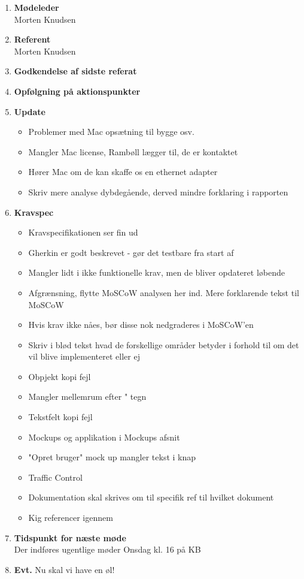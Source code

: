 	\begin{enumerate}
		\itemsep 0.3em 
		\item \textbf{Mødeleder}\\
			Morten Knudsen
		\item \textbf{Referent}\\
			Morten Knudsen
		\item \textbf{Godkendelse af sidste referat}
			
		\item\textbf{Opfølgning på aktionspunkter}

		\item \textbf{Update}
			\begin{itemize}[-]
			\item Problemer med Mac opsætning til bygge osv. \\
			\item Mangler Mac license, Rambøll lægger til, de er kontaktet \\
			\item Hører Mac om de kan skaffe os en ethernet adapter \\
			
			\item Skriv mere analyse dybdegående, derved mindre forklaring i rapporten
		\end{itemize}
	
		\item \textbf{Kravspec}
		\begin{itemize}[-]
			\item Kravspecifikationen ser fin ud
			\item Gherkin er godt beskrevet - gør det testbare fra start af
			\item Mangler lidt i ikke funktionelle krav, men de bliver opdateret løbende
			\item Afgrænsning, flytte MoSCoW analysen her ind. Mere forklarende tekst til MoSCoW
			\item Hvis krav ikke nåes, bør disse nok nedgraderes i MoSCoW'en
			\item Skriv i blød tekst hvad de forskellige områder betyder i forhold til om det vil blive implementeret eller ej
			\item Obpjekt kopi fejl
			\item Mangler mellemrum efter " tegn
			\item Tekstfelt kopi fejl
			\item Mockups og applikation i Mockups afsnit
			\item "Opret bruger" mock up mangler tekst i knap
			\item Traffic Control 
			\item Dokumentation skal skrives om til specifik ref til hvilket dokument  			
			\item Kig referencer igennem	
		\end{itemize}
	
		\item \textbf{Tidspunkt for næste møde} \\
			Der indføres ugentlige møder
			Onsdag kl. 16 på KB
			
		\item \textbf{Evt.}
			Nu skal vi have en øl!
	\end{enumerate}
